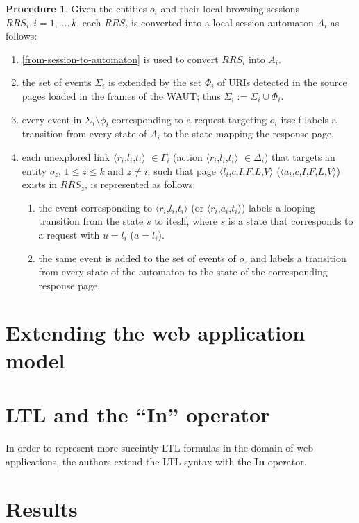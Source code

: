 \documentclass[a4paper,10pt]{article}
\newcommand{\tuple}[1]{\mbox{$\langle$#1$\rangle$}}
\theoremstyle{plain} %
\theoremstyle{definition}
\newtheorem{procedure}{Procedure}
\theoremstyle{remark}
\begin{document}
\begin{procedure}
  \label{from-local-session-to-automaton}
  Given the entities $o_i$ and their local browsing sessions $RRS_i, i=1,\dots,k$, each $RRS_i$ is converted into a local session automaton $A_i$ as follows:
  \begin{enumerate}
    \item \cref{from-session-to-automaton} is used to convert $RRS_i$ into $A_i$.
    \item the set of events $\Sigma_i$ is extended by the set $\Phi_i$ of URIs detected in the source pages loaded in the frames of the WAUT; thus $\Sigma_i:=\Sigma_i\cup\Phi_i$.
    \item every event in $\Sigma_i\setminus\phi_i$ corresponding to a request targeting $o_i$ itself labels a transition from every state of $A_i$ to the state mapping the response page.
    \item each unexplored link \tuple{$r_i$,$l_i$,$t_i$} $\in\Gamma_i$ (action \tuple{$r_i$,$l_i$,$t_i$} $\in\Delta_i$) that targets an entity $o_z$, $1\leq z \leq k$ and $z \neq i$, such that page \tuple{$l_i$,$c$,$I$,$F$,$L$,$V$} (\tuple{$a_i$,$c$,$I$,$F$,$L$,$V$}) exists in $RRS_z$, is represented as follows:
    \begin{enumerate}
      \item the event corresponding to \tuple{$r_i$,$l_i$,$t_i$} (or \tuple{$r_i$,$a_i$,$t_i$}) labels a looping transition from the state $s$ to iteslf, where $s$ is a state that corresponds to a request with $u=l_i$ ($a=l_i$).
      \item the same event is added to the set of events of $o_z$ and labels a transition from every state of the automaton to the state of the corresponding response page.
    \end{enumerate}
  \end{enumerate}
\end{procedure}

\section{Extending the web application model}

\section{LTL and the ``In'' operator}
\label{ltl-and-the-in-operator}

In order to represent more succintly LTL formulas in the domain of web
applications, the authors extend the LTL syntax with the \textbf{In}
operator.

\section{Results}
\label{results}

\clearpage
\printbibliography
\end{document}
